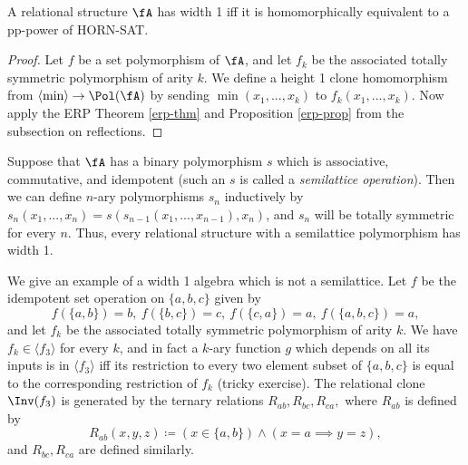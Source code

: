 \begin{cor} A relational structure $\fA$ has width 1 iff it is homomorphically equivalent to a pp-power of HORN-SAT.
\end{cor}
\begin{proof} Let $f$ be a set polymorphism of $\fA$, and let $f_k$ be the associated totally symmetric polymorphism of arity $k$. We define a height 1 clone homomorphism from $\langle \min \rangle \rightarrow \Pol(\fA)$ by sending $\min(x_1, ..., x_k)$ to $f_k(x_1, ..., x_k)$. Now apply the ERP Theorem \ref{erp-thm} and Proposition \ref{erp-prop} from the subsection on reflections.
\end{proof}

\begin{ex} Suppose that $\fA$ has a binary polymorphism $s$ which is associative, commutative, and idempotent (such an $s$ is called a \emph{semilattice operation}). Then we can define $n$-ary polymorphisms $s_n$ inductively by $s_n(x_1, ..., x_n) = s(s_{n-1}(x_1, ..., x_{n-1}), x_n)$, and $s_n$ will be totally symmetric for every $n$. Thus, every relational structure with a semilattice polymorphism has width 1.
\end{ex}

\begin{ex} We give an example of a width 1 algebra which is not a semilattice. Let $f$ be the idempotent set operation on $\{a,b,c\}$ given by
\[
f(\{a,b\}) = b,\ f(\{b,c\}) = c,\ f(\{c,a\}) = a,\ f(\{a,b,c\}) = a,
\]
and let $f_k$ be the associated totally symmetric polymorphism of arity $k$. We have $f_k \in \langle f_3 \rangle$ for every $k$, and in fact a $k$-ary function $g$ which depends on all its inputs is in $\langle f_3 \rangle$ iff its restriction to every two element subset of $\{a,b,c\}$ is equal to the corresponding restriction of $f_k$ (tricky exercise). The relational clone $\Inv(f_3)$ is generated by the ternary relations $R_{ab}, R_{bc}, R_{ca},$ where $R_{ab}$ is defined by
\[
R_{ab}(x,y,z) \coloneqq (x \in \{a,b\}) \wedge (x=a \implies y=z),
\]
and $R_{bc}, R_{ca}$ are defined similarly.
\end{ex}

